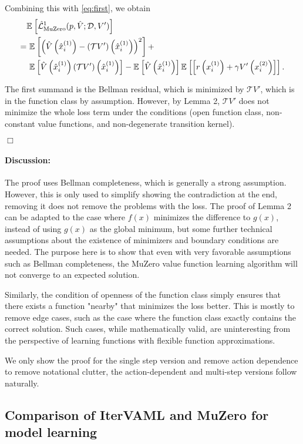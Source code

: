 Combining this with \autoref{eq:first}, we obtain
%
\begin{align*}
    &\mathbb{E}_{}\left[  \hat{\mathcal{L}}^1_\text{MuZero}(p, \hat{V}; \mathcal{D}, V') \right]\nonumber\\
  = &~\mathbb{E}_{}\left[   \left( \hat{V}\left( \hat{x}^{(1)}_i \right) - \left( \mathcal{T}V' \right)\left( \hat{x}^{(1)}_i \right) \right)^2 \right] + \\&~\mathbb{E}_{}\left[   \hat{V}\left( \hat{x}^{(1)}_i \right)\left( \mathcal{T}V' \right)\left( \hat{x}^{(1)}_i \right) \right] - \mathbb{E}_{}\left[  \hat{V}\left( \hat{x}^{(1)}_i \right) \right] \mathbb{E}_{}\left[  \left[ r\left( x^{(1)}_i \right) + \gamma V'\left( x^{(2)}_{i} \right)  \right] \right].
\end{align*}

The first summand is the Bellman residual, which is minimized by $\mathcal{T}V'$, which is in the function class by assumption.
However, by Lemma 2, $\mathcal{T}{V'}$ does not minimize the whole loss term under the conditions (open function class, non-constant value functions, and non-degenerate transition kernel).

\hfill \ensuremath{\Box}

\paragraph{Discussion:}

The proof uses Bellman completeness, which is generally a strong assumption.
However, this is only used to simplify showing the contradiction at the end, removing it does not remove the problems with the loss.
The proof of Lemma 2 can be adapted to the case where $f(x)$ minimizes the difference to $g(x)$, instead of using $g(x)$ as the global minimum, but some further technical assumptions about the existence of minimizers and boundary conditions are needed. 
The purpose here is to show that even with very favorable assumptions such as Bellman completeness, the MuZero value function learning algorithm will not converge to an expected solution.

Similarly, the condition of openness of the function class simply ensures that there exists a function "nearby" that minimizes the loss better.
This is mostly to remove edge cases, such as the case where the function class exactly contains the correct solution.
Such cases, while mathematically valid, are uninteresting from the perspective of learning functions with flexible function approximations.

We only show the proof for the single step version and remove action dependence to remove notational clutter, the action-dependent and multi-step versions follow naturally.

\subsection{Comparison of IterVAML and MuZero for model learning}
\label{app:comp_itervaml_muzero}

